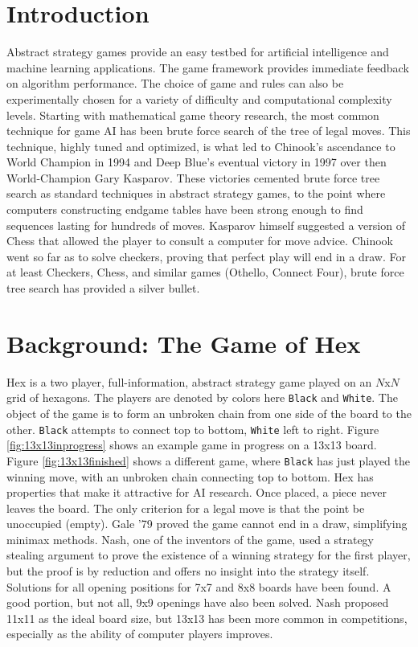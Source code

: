 \documentclass[11pt]{report}
\newcommand{\black}{\texttt{Black}}
\newcommand{\white}{\texttt{White}}
\begin{document}
\section{Introduction}
Abstract strategy games provide an easy testbed for artificial intelligence and machine learning applications. The game framework provides immediate feedback on algorithm performance. The choice of game and rules can also be experimentally chosen for a variety of difficulty and computational complexity levels. Starting with mathematical game theory research, the most common technique for game AI has been brute force search of the tree of legal moves. This technique, highly tuned and optimized, is what led to Chinook's ascendance to World Champion in 1994 and Deep Blue's eventual victory in 1997 over then World-Champion Gary Kasparov. These victories cemented brute force tree search as standard techniques in abstract strategy games, to the point where computers constructing endgame tables have been strong enough to find sequences lasting for hundreds of moves. Kasparov himself suggested a version of Chess that allowed the player to consult a computer for move advice. Chinook went so far as to solve checkers, proving that perfect play will end in a draw. For at least Checkers, Chess, and similar games (Othello, Connect Four), brute force tree search has provided a silver bullet.

\section{Background: The Game of Hex}
Hex is a two player, full-information, abstract strategy game played on an $N$x$N$ grid of hexagons. The players are denoted by colors here \black{} and \white. The object of the game is to form an unbroken chain from one side of the board to the other. \black{} attempts to connect top to bottom, \white{} left to right. Figure \ref{fig:13x13inprogress} shows an example game in progress on a 13x13 board. Figure \ref{fig:13x13finished} shows a different game, where \black{} has just played the winning move, with an unbroken chain connecting top to bottom. Hex has properties that make it attractive for AI research. Once placed, a piece never leaves the board. The only criterion for a legal move is that the point be unoccupied (empty). Gale '79 proved the game cannot end in a draw, simplifying minimax methods. Nash, one of the inventors of the game, used a strategy stealing argument to prove the existence of a winning strategy for the first player, but the proof is by reduction and offers no insight into the strategy itself. Solutions for all opening positions for 7x7 and 8x8 boards have been found\cite{henderson2009solving}. A good portion, but not all, 9x9 openings have also been solved. Nash proposed 11x11 as the ideal board size, but 13x13 has been more common in competitions, especially as the ability of computer players improves.
\end{document}
